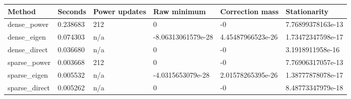 \begin{tabular}{llllll}
\hline
Method & Seconds & Power updates & Raw minimum & Correction mass & Stationarity \\
\hline
dense\_power & 0.238683 & 212 & 0 & -0 & 7.76899378163e-13 \\
dense\_eigen & 0.074303 & n/a & -8.06313061579e-28 & 4.45487966523e-26 & 1.73472347598e-17 \\
dense\_direct & 0.036680 & n/a & 0 & -0 & 3.1918911958e-16 \\
sparse\_power & 0.003668 & 212 & 0 & -0 & 7.76906317057e-13 \\
sparse\_eigen & 0.005532 & n/a & -4.0315653079e-28 & 2.01578265395e-26 & 1.38777878078e-17 \\
sparse\_direct & 0.005262 & n/a & 0 & -0 & 8.48773347979e-18 \\
\hline
\end{tabular}
